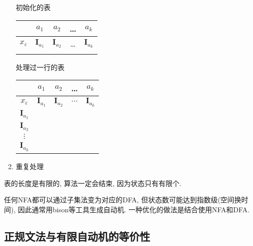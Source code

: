 \begin{enumerate}
                \begin{center}
                    \begin{minipage}[h!]{.4\linewidth}
                        \centering 初始化的表 \\
                        \begin{tabular}{ccccc} \toprule
                             & $a_1$ & $a_2$ & \ldots & $a_k$ \\ \midrule
                            $x_\varepsilon$ & $\mathbf{I}_{a_1}$ & $\mathbf{I}_{a_2}$ & \ldots & $\mathbf{I}_{a_k}$ \\
                            \\ \bottomrule
                        \end{tabular}
                    \end{minipage}
                    \begin{minipage}[h!]{.4\linewidth}
                        \centering 处理过一行的表 \\
                        \begin{tabular}{ccccc} \toprule
                             & $a_1$ & $a_2$ & \ldots & $a_k$ \\ \midrule
                            $x_\varepsilon$ & $\mathbf{I}_{a_1}$ & $\mathbf{I}_{a_2}$ & $\cdots$ & $\mathbf{I}_{a_k}$ \\
                            $\mathbf{I}_{a_1}$ \\
                            $\mathbf{I}_{a_2}$ \\
                            $\vdots$ \\
                            $\mathbf{I}_{a_k}$ \\ \bottomrule
                        \end{tabular}
                    \end{minipage}
                \end{center}
            \item 重复处理
        \end{enumerate}

        表的长度是有限的, 算法一定会结束, 因为状态只有有限个.

        任何NFA都可以通过子集法变为对应的DFA, 但状态数可能达到指数级(空间换时间), 因此通常用bison等工具生成自动机. 一种优化的做法是结合使用NFA和DFA.

    \subsection{正规文法与有限自动机的等价性}

